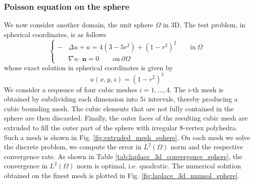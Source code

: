 \documentclass[a4paper]{article}
\begin{document}
 
\subsubsection{Poisson equation on the sphere}
\label{sec:laplace_sphere}
We now consider another domain, the unit sphere $\Omega$ in 3D. The test problem, in spherical coordinates, is as follows
\begin{equation}
\label{experiment_laplace_equation_3d_sphere}
\begin{cases}
-&\Delta u + u = 4(3-5r^2) + (1-r^2)^2 \qquad \text{in}\ \Omega\\
&\nabla u \cdot \boldsymbol{n} = 0 \qquad \text{on}\ \partial \Omega
\end{cases}
\end{equation}
whose exact solution in spherical coordinates is given by
\begin{equation}
u(x,y,z) = (1-r^2)^2
\end{equation}
We consider a sequence of four cubic meshes $i=1,\dots,4$. The $i$-th mesh is obtained by subdividing each dimension into $5i$ intervals, thereby producing a cubic bounding mesh.  The cubic elements that are not fully contained in the sphere are then discarded. Finally, the outer faces of the resulting cubic mesh are extruded to fill the outer part of the sphere with irregular $8$-vertex polyhedra.  Such a mesh is shown in Fig.  \ref{fig:extruded_mesh_sphere}. On each mesh we solve the discrete problem,  we compute the error in $L^2(\Omega)$ norm and the respective convergence rate. As shown in Table \ref{tab:laplace_3d_convergence_sphere}, the convergence in $L^2(\Omega)$ norm is optimal, i.e. quadratic. The numerical solution obtained on the finest mesh is plotted in Fig.  \ref{fig:laplace_3d_numsol_sphere}.
\end{document}

